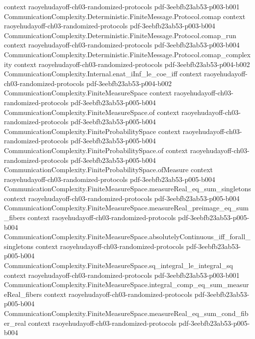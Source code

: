 \begin{theorem}
  {context}
  {raoyehudayoff-ch03-randomized-protocols}
  {pdf-3eebfb23ab53-p003-b001}
\proofstep
  {CommunicationComplexity.Deterministic.FiniteMessage.Protocol.comap}
  {context}
  {raoyehudayoff-ch03-randomized-protocols}
  {pdf-3eebfb23ab53-p003-b004}
\proofstep
  {CommunicationComplexity.Deterministic.FiniteMessage.Protocol.comap_run}
  {context}
  {raoyehudayoff-ch03-randomized-protocols}
  {pdf-3eebfb23ab53-p003-b004}
\proofstep
  {CommunicationComplexity.Deterministic.FiniteMessage.Protocol.comap_complexity}
  {context}
  {raoyehudayoff-ch03-randomized-protocols}
  {pdf-3eebfb23ab53-p004-b002}
\proofstep
  {CommunicationComplexity.Internal.enat_iInf_le_coe_iff}
  {context}
  {raoyehudayoff-ch03-randomized-protocols}
  {pdf-3eebfb23ab53-p004-b002}
\proofstep
  {CommunicationComplexity.FiniteMeasureSpace}
  {context}
  {raoyehudayoff-ch03-randomized-protocols}
  {pdf-3eebfb23ab53-p005-b004}
\proofstep
  {CommunicationComplexity.FiniteMeasureSpace.of}
  {context}
  {raoyehudayoff-ch03-randomized-protocols}
  {pdf-3eebfb23ab53-p005-b004}
\proofstep
  {CommunicationComplexity.FiniteProbabilitySpace}
  {context}
  {raoyehudayoff-ch03-randomized-protocols}
  {pdf-3eebfb23ab53-p005-b004}
\proofstep
  {CommunicationComplexity.FiniteProbabilitySpace.of}
  {context}
  {raoyehudayoff-ch03-randomized-protocols}
  {pdf-3eebfb23ab53-p005-b004}
\proofstep
  {CommunicationComplexity.FiniteProbabilitySpace.ofMeasure}
  {context}
  {raoyehudayoff-ch03-randomized-protocols}
  {pdf-3eebfb23ab53-p005-b004}
\proofstep
  {CommunicationComplexity.FiniteMeasureSpace.measureReal_eq_sum_singletons}
  {context}
  {raoyehudayoff-ch03-randomized-protocols}
  {pdf-3eebfb23ab53-p005-b004}
\proofstep
  {CommunicationComplexity.FiniteMeasureSpace.measureReal_preimage_eq_sum_fibers}
  {context}
  {raoyehudayoff-ch03-randomized-protocols}
  {pdf-3eebfb23ab53-p005-b004}
\proofstep
  {CommunicationComplexity.FiniteMeasureSpace.absolutelyContinuous_iff_forall_singletons}
  {context}
  {raoyehudayoff-ch03-randomized-protocols}
  {pdf-3eebfb23ab53-p005-b004}
\proofstep
  {CommunicationComplexity.FiniteMeasureSpace.sq_integral_le_integral_sq}
  {context}
  {raoyehudayoff-ch03-randomized-protocols}
  {pdf-3eebfb23ab53-p003-b001}
\proofstep
  {CommunicationComplexity.FiniteMeasureSpace.integral_comp_eq_sum_measureReal_fibers}
  {context}
  {raoyehudayoff-ch03-randomized-protocols}
  {pdf-3eebfb23ab53-p005-b004}
\proofstep
  {CommunicationComplexity.FiniteMeasureSpace.measureReal_eq_sum_cond_fiber_real}
  {context}
  {raoyehudayoff-ch03-randomized-protocols}
  {pdf-3eebfb23ab53-p005-b004}
\proofstep

\end{theorem}
